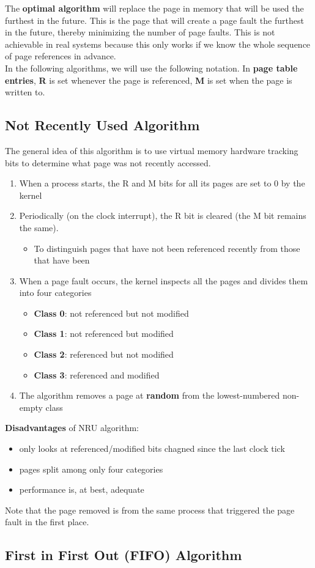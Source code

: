 \documentclass{article}
\newcommand{\bold}[1]{\textbf{#1}}
\renewcommand{\b}{\item[$\circ$]}
\newcommand{\newlist}{\begin{itemize}}
\renewcommand{\endlist}{\end{itemize}}
\begin{document}
The \bold{optimal algorithm} will replace the page in memory that will be used the furthest in the future. This is the page that will create a page fault the furthest in the future, thereby minimizing the number of page faults. This is not achievable in real systems because this only works if we know the whole sequence of page references in advance. \\ 

In the following algorithms, we will use the following notation. In \bold{page table entries}, \bold{R} is set whenever the page is referenced, \bold{M} is set when the page is written to. 

\subsection{Not Recently Used Algorithm}

The general idea of this algorithm is to use virtual memory hardware tracking bits to determine what page was not recently accessed. 

\begin{enumerate}
    \item When a process starts, the R and M bits for all its pages are set to 0 by the kernel
    \item Periodically (on the clock interrupt), the R bit is cleared (the M bit remains the same). 
        \newlist 
        \b To distinguish pages that have not been referenced recently from those that have been 
        \endlist
    \item When a page fault occurs, the kernel inspects all the pages and divides them into four categories
        \newlist 
        \b \bold{Class 0}: not referenced but not modified
        \b \bold{Class 1}: not referenced but modified
        \b \bold{Class 2}: referenced but not modified
        \b \bold{Class 3}: referenced and modified
        \endlist
    \item The algorithm removes a page at \bold{random} from the lowest-numbered non-empty class
\end{enumerate}

\bold{Disadvantages} of NRU algorithm:
\newlist 
\b only looks at referenced/modified bits chagned since the last clock tick
\b pages split among only four categories
\b performance is, at best, adequate
\endlist

Note that the page removed is from the same process that triggered the page fault in the first place. 

\subsection{First in First Out (FIFO) Algorithm}
\end{document}
